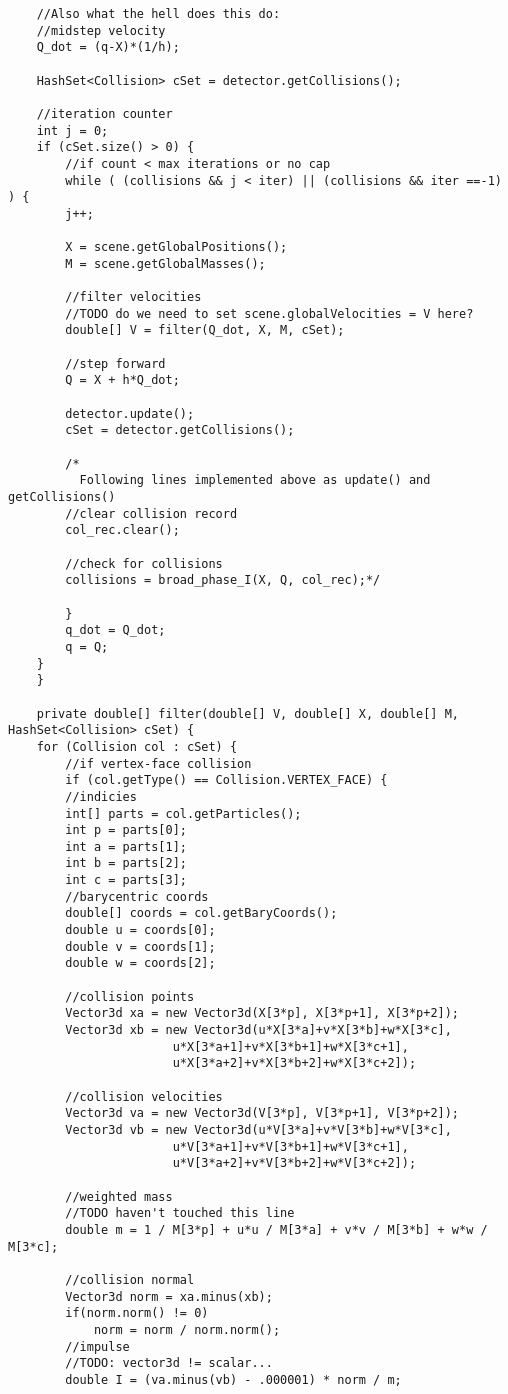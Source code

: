 \begin{lstlisting}
	//Also what the hell does this do:
	//midstep velocity
	Q_dot = (q-X)*(1/h);
	
	HashSet<Collision> cSet = detector.getCollisions();
	
	//iteration counter
	int j = 0;
	if (cSet.size() > 0) {
	    //if count < max iterations or no cap
	    while ( (collisions && j < iter) || (collisions && iter ==-1) ) {
		j++;
		
		X = scene.getGlobalPositions();
		M = scene.getGlobalMasses();

		//filter velocities
		//TODO do we need to set scene.globalVelocities = V here?
		double[] V = filter(Q_dot, X, M, cSet);

		//step forward
		Q = X + h*Q_dot;

		detector.update();
		cSet = detector.getCollisions();
		
		/*
		  Following lines implemented above as update() and getCollisions()
		//clear collision record
		col_rec.clear();

		//check for collisions
		collisions = broad_phase_I(X, Q, col_rec);*/

	    }
	    q_dot = Q_dot; 
	    q = Q;
	}	
    }

    private double[] filter(double[] V, double[] X, double[] M, HashSet<Collision> cSet) {
	for (Collision col : cSet) {
	    //if vertex-face collision
	    if (col.getType() == Collision.VERTEX_FACE) {
		//indicies
		int[] parts = col.getParticles();
		int p = parts[0];
		int a = parts[1];
		int b = parts[2];
		int c = parts[3];
		//barycentric coords
		double[] coords = col.getBaryCoords();
		double u = coords[0];
		double v = coords[1];
		double w = coords[2];

		//collision points
		Vector3d xa = new Vector3d(X[3*p], X[3*p+1], X[3*p+2]);
		Vector3d xb = new Vector3d(u*X[3*a]+v*X[3*b]+w*X[3*c],
					   u*X[3*a+1]+v*X[3*b+1]+w*X[3*c+1],
					   u*X[3*a+2]+v*X[3*b+2]+w*X[3*c+2]);

		//collision velocities
		Vector3d va = new Vector3d(V[3*p], V[3*p+1], V[3*p+2]);
		Vector3d vb = new Vector3d(u*V[3*a]+v*V[3*b]+w*V[3*c],
					   u*V[3*a+1]+v*V[3*b+1]+w*V[3*c+1],
					   u*V[3*a+2]+v*V[3*b+2]+w*V[3*c+2]);
		
		//weighted mass
		//TODO haven't touched this line
		double m = 1 / M[3*p] + u*u / M[3*a] + v*v / M[3*b] + w*w / M[3*c];

		//collision normal
		Vector3d norm = xa.minus(xb);
		if(norm.norm() != 0)
		    norm = norm / norm.norm();
		//impulse
		//TODO: vector3d != scalar...
		double I = (va.minus(vb) - .000001) * norm / m;
		

\end{lstlisting}
